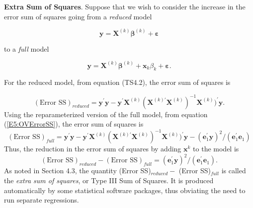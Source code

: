 \textbf{Extra Sum of Squares}. Suppose that we wish to consider the
increase in the error sum of squares going from a \textit{reduced}
model
\begin{center}
\[
\mathbf{y}=\mathbf{X}^{(k)}\boldsymbol \beta^{(k)}+ \boldsymbol
\varepsilon
\]
\end{center}
to a \textit{full} model
\begin{center}
\[
\mathbf{y}=\mathbf{X}^{(k)}\boldsymbol
\beta^{(k)}+\mathbf{x}_{k}\beta_{k}+ \boldsymbol \varepsilon.
\]
\end{center}
For the reduced model, from equation (TS4.2), the error sum of
squares is

\begin{equation}\label{E5:ESSReduced}
(\text{Error SS})_{reduced}=\mathbf{y}^{\prime}\mathbf{y}-\mathbf{y}%
^{\prime}\mathbf{X}^{(k)}(\mathbf{X}^{(k)\prime }\mathbf{X}^{(k)})^{-1}%
\mathbf{X}^{(k)})^{\prime}\mathbf{y}.
\end{equation}
Using the reparameterized version of the full model, from equation
(\ref{E5:OVErrorSS}), the error sum of squares is
\begin{equation}\label{E5:ESSFull}
(\text{Error SS})_{full}=\mathbf{y}^{\prime}\mathbf{y}-\mathbf{y}^{\prime}%
\mathbf{X}^{(k)}(\mathbf{X}^{(k)\prime }\mathbf{X}^{(k)})^{-1}\mathbf{X}%
^{(k)})^{\prime}\mathbf{y}-\left( \mathbf{e}_1^{\prime}\mathbf{y}%
\right) ^2/\left( \mathbf{e}_1^{\prime}\mathbf{e}%
_1\right)
\end{equation}
Thus, the reduction in the error sum of squares by adding
$\mathbf{x}^{k}$ to the model is
\begin{equation}\label{E5:ESSReduction}
(\text{Error SS})_{reduced}-(\text{Error SS})_{full}=\left( \mathbf{e}%
_1^{\prime}\mathbf{y}\right) ^2/\left( \mathbf{e}_1^{\prime}%
\mathbf{e}_1\right) .
\end{equation}
As noted in Section 4.3, the quantity (Error SS)$_{reduced}-$ (Error SS)$%
_{full}$ is called the \textit{extra sum of squares}, or Type III
Sum of Squares. It is produced automatically by some statistical
software packages, thus obviating the need to run separate
regressions.

